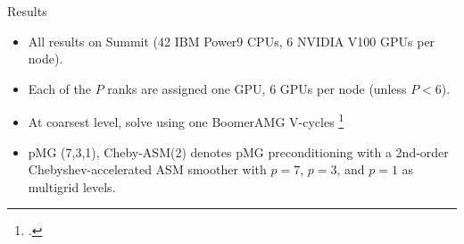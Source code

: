 \begin{frame}{Results}
  \begin{itemize}
    \item All results on Summit (42 IBM Power9 CPUs, 6 NVIDIA V100 GPUs per node).
    \item Each of the $P$ ranks are assigned one GPU, 6 GPUs per node (unless $P<6$).
    \item At coarsest level, solve using one BoomerAMG V-cycles \footcite{henson_boomeramg_2002}
    \item pMG (7,3,1), Cheby-ASM(2) denotes pMG preconditioning with a 2nd-order Chebyshev-accelerated ASM smoother with %
    $p=7$, $p=3$, and $p=1$ as multigrid levels.
  \end{itemize}
\end{frame}